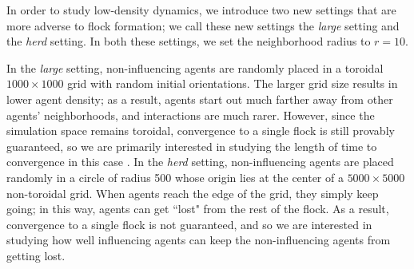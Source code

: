 In order to study low-density dynamics, we introduce two new settings that are
more adverse to flock formation; we call these new settings the \textit{large}
setting and the \textit{herd} setting.
In both these settings, we set the neighborhood radius to $r=10$.

In the \textit{large} setting, non-influencing agents are randomly placed in a
toroidal $1000\times1000$ grid with random initial orientations.
The larger grid size results in lower agent density; as a result, agents start
out much farther away from other agents' neighborhoods, and interactions are
much rarer.
However, since the simulation space remains toroidal, convergence to a single
flock is still provably guaranteed, so we are primarily interested in
studying the length of time to convergence in this case
\cite{jad2003convergence}.
In the \textit{herd} setting, non-influencing agents are placed randomly in a
circle of radius 500 whose origin lies at the center of a $5000\times5000$
non-toroidal grid.
When agents reach the edge of the grid, they simply keep going; in this way,
agents can get ``lost" from the rest of the flock.
As a result, convergence to a single flock is not guaranteed, and so we are
interested in studying how well influencing agents can keep the non-influencing
agents from getting lost.
